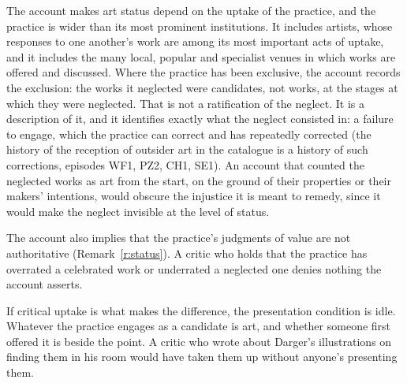 \documentclass{situationist-preprint}
\begin{document}
\begin{reply}
The account makes art status depend on the uptake of the practice, and the practice is wider than its most prominent institutions. It includes artists, whose responses to one another's work are among its most important acts of uptake, and it includes the many local, popular and specialist venues in which works are offered and discussed. Where the practice has been exclusive, the account records the exclusion: the works it neglected were candidates, not works, at the stages at which they were neglected. That is not a ratification of the neglect. It is a description of it, and it identifies exactly what the neglect consisted in: a failure to engage, which the practice can correct and has repeatedly corrected (the history of the reception of outsider art in the catalogue is a history of such corrections, episodes WF1, PZ2, CH1, SE1). An account that counted the neglected works as art from the start, on the ground of their properties or their makers' intentions, would obscure the injustice it is meant to remedy, since it would make the neglect invisible at the level of status.

The account also implies that the practice's judgments of value are not authoritative (Remark~\ref{r:status}). A critic who holds that the practice has overrated a celebrated work or underrated a neglected one denies nothing the account asserts.
\end{reply}

\begin{objection}\label{o:redundant}
If critical uptake is what makes the difference, the presentation condition is idle. Whatever the practice engages as a candidate is art, and whether someone first offered it is beside the point. A critic who wrote about Darger's illustrations on finding them in his room would have taken them up without anyone's presenting them.
\end{objection}
\end{document}
